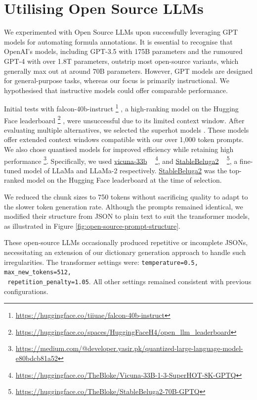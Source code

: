 \section{Utilising Open Source LLMs}

We experimented with Open Source LLMs upon successfully leveraging GPT models for automating formula annotations. It is essential to recognise that OpenAI's models, including GPT-3.5 with 175B parameters and the rumoured GPT-4 with over 1.8T parameters, outstrip most open-source variants, which generally max out at around 70B parameters. However, GPT models are designed for general-purpose tasks, whereas our focus is primarily instructional. We hypothesised that instructive models could offer comparable performance.

Initial tests with falcon-40b-instruct \footnote{\url{https://huggingface.co/tiiuae/falcon-40b-instruct}} \citep{falcon40b, refinedweb, xu2023baize}, a high-ranking model on the Hugging Face leaderboard \footnote{\url{https://huggingface.co/spaces/HuggingFaceH4/open_llm_leaderboard}} \citep{jain2022hugging}, were unsuccessful due to its limited context window. After evaluating multiple alternatives, we selected the superhot models \citep{chen2023extending}. These models offer extended context windows compatible with our over 1,000 token prompts. We also chose quantised models for improved efficiency while retaining high performance \footnote{\url{https://medium.com/@developer.yasir.pk/quantized-large-language-model-e80bdcb81a52}}. Specifically, we used \href{https://huggingface.co/TheBloke/Vicuna-33B-1-3-SuperHOT-8K-GPTQ}{vicuna-33b} ~\citep{zheng2023judging} \footnote{\url{https://huggingface.co/TheBloke/Vicuna-33B-1-3-SuperHOT-8K-GPTQ}}, and \href{https://huggingface.co/TheBloke/StableBeluga2-70B-GPTQ}{StableBeluga2} ~\citep{StableBelugaModels, touvron2023llama, mukherjee2023orca} \footnote{\url{https://huggingface.co/TheBloke/StableBeluga2-70B-GPTQ}}, a fine-tuned model of LLaMa and LLaMa-2 respectively. \href{https://huggingface.co/TheBloke/StableBeluga2-70B-GPTQ}{StableBeluga2} was the top-ranked model on the Hugging Face leaderboard at the time of selection.

We reduced the chunk sizes to 750 tokens without sacrificing quality to adapt to the slower token generation rate. Although the prompts remained identical, we modified their structure from JSON to plain text to suit the transformer models, as illustrated in Figure \ref{fig:open-source-prompt-structure}. 

These open-source LLMs occasionally produced repetitive or incomplete JSONs, necessitating an extension of our dictionary generation approach to handle such irregularities. The transformer settings were: \texttt{temperature=0.5, max\_new\_tokens=512,} \\ \texttt{ repetition\_penalty=1.05}. All other settings remained consistent with previous configurations.

